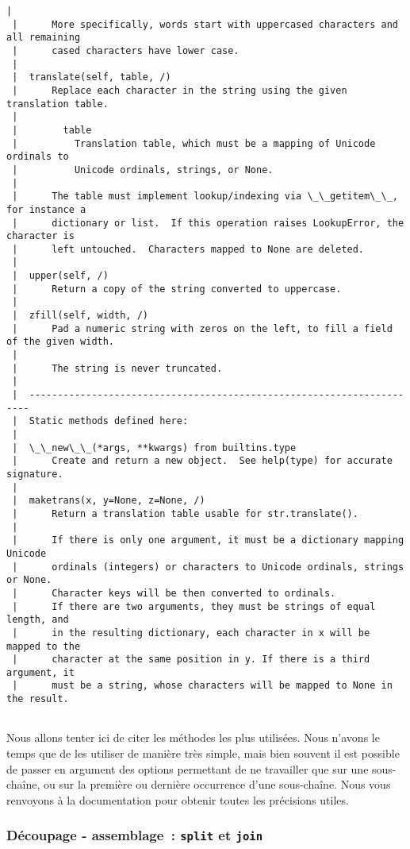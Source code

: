\begin{Verbatim}[commandchars=\\\{\}]
 |      
 |      More specifically, words start with uppercased characters and all remaining
 |      cased characters have lower case.
 |  
 |  translate(self, table, /)
 |      Replace each character in the string using the given translation table.
 |      
 |        table
 |          Translation table, which must be a mapping of Unicode ordinals to
 |          Unicode ordinals, strings, or None.
 |      
 |      The table must implement lookup/indexing via \_\_getitem\_\_, for instance a
 |      dictionary or list.  If this operation raises LookupError, the character is
 |      left untouched.  Characters mapped to None are deleted.
 |  
 |  upper(self, /)
 |      Return a copy of the string converted to uppercase.
 |  
 |  zfill(self, width, /)
 |      Pad a numeric string with zeros on the left, to fill a field of the given width.
 |      
 |      The string is never truncated.
 |  
 |  ----------------------------------------------------------------------
 |  Static methods defined here:
 |  
 |  \_\_new\_\_(*args, **kwargs) from builtins.type
 |      Create and return a new object.  See help(type) for accurate signature.
 |  
 |  maketrans(x, y=None, z=None, /)
 |      Return a translation table usable for str.translate().
 |      
 |      If there is only one argument, it must be a dictionary mapping Unicode
 |      ordinals (integers) or characters to Unicode ordinals, strings or None.
 |      Character keys will be then converted to ordinals.
 |      If there are two arguments, they must be strings of equal length, and
 |      in the resulting dictionary, each character in x will be mapped to the
 |      character at the same position in y. If there is a third argument, it
 |      must be a string, whose characters will be mapped to None in the result.


    \end{Verbatim}

    Nous allons tenter ici de citer les méthodes les plus utilisées. Nous
n'avons le temps que de les utiliser de manière très simple, mais bien
souvent il est possible de passer en argument des options permettant de
ne travailler que sur une sous-chaîne, ou sur la première ou dernière
occurrence d'une sous-chaîne. Nous vous renvoyons à la documentation
pour obtenir toutes les précisions utiles.

    \hypertarget{duxe9coupage---assemblage-split-et-join}{%
\subsubsection{\texorpdfstring{Découpage - assemblage~: \texttt{split}
et
\texttt{join}}{Découpage - assemblage~: split et join}}\label{duxe9coupage---assemblage-split-et-join}}


